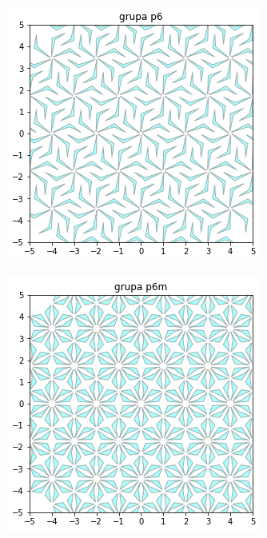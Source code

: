 \documentclass[11pt]{article}
\begin{document}
\begin{figure}[H]
\begin{subfigure}[b]{0.22\textwidth}
    \label{fig:f15}
  \end{subfigure}
  \begin{subfigure}[b]{0.22\textwidth}
    \includegraphics[width=\textwidth]{output_87_8.png}
    \label{fig:f16}
    \end{subfigure}
   \begin{subfigure}[b]{0.22\textwidth}
    \includegraphics[width=\textwidth]{output_87_9.png}
    \label{fig:f17}
  \end{subfigure}
\end{figure}
\end{document}

